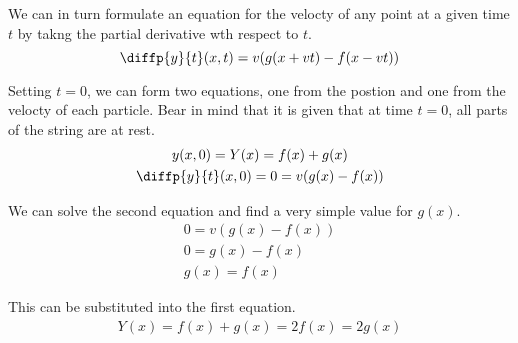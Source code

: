 \documentclass[12pt]{article}
\begin{document}
            We can in turn formulate an equation for the velocty of any point at a given time $t$ by takng the partial derivative wth respect to $t$.
            \begin{equation}
                \diffp{y}{t}(x,t) = v(g(x + vt) - f(x - vt))
            \end{equation}

            Setting $t = 0$, we can form two equations, one from the postion and one from the velocty of each particle.
            Bear in mind that it is given that at time $t = 0$, all parts of the string are at rest.
            \begin{gather}
                y(x,0) = Y(x) = f(x) + g(x)\\
                \diffp{y}{t}(x,0) = 0 = v(g(x) - f(x))
            \end{gather}

            We can solve the second equation and find a very simple value for $g(x)$.
            \begin{gather}
                0 = v(g(x) - f(x))\\
                0 = g(x) - f(x)\\
                g(x) = f(x)
            \end{gather}

            This can be substituted into the first equation.
            \begin{gather}
                Y(x) = f(x) + g(x)
                    =   2f(x)
                    =   2g(x)
            \end{gather}
\end{document}
